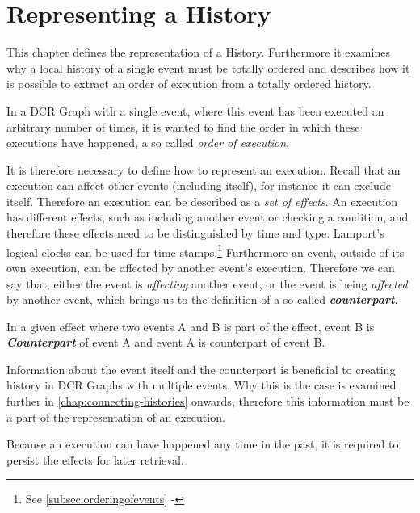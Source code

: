 \chapter{Representing a History}\label{chap:representing-a-history}
	This chapter defines the representation of a History. Furthermore it examines why a local history of a single event must be totally ordered and describes how it is possible to extract an order of execution from a totally ordered history.
	
	\newpar	In a DCR Graph with a single event, where this event has been executed an arbitrary number of times, it is wanted to find the order in which these executions have happened, a so called \textit{order of execution}.
	
	\newpar	It is therefore necessary to define how to represent an execution. Recall that an execution can affect other events (including itself), for instance it can exclude itself. Therefore an execution can be described as a \textit{set of effects}. An execution has different effects, such as including another event or checking a condition, and therefore these effects need to be distinguished by time and type. Lamport's logical clocks can be used for time stamps.\footnote{See \autoref{subsec:orderingofevents} - } Furthermore an event, outside of its own execution, can be affected by another event's execution. Therefore we can say that, either the event is \textit{affecting} another event, or the event is being \textit{affected} by another event, which brings us to the definition of a so called \textit{\textbf{counterpart}}.

	\noindent\hrulefill	
	\begin{definition}
		In a given effect where two events A and B is part of the effect, event B is \textbf{\textit{Counterpart}} of event A and event A is counterpart of event B.
		
		\noindent\hrulefill
	\end{definition}
	
	\newpar Information about the event itself and the counterpart is beneficial to creating history in DCR Graphs with multiple events. Why this is the case is examined further in \autoref{chap:connecting-histories} onwards, therefore this information must be a part of the representation of an execution.
	
	\newpar Because an execution can have happened any time in the past, it is required to persist the effects for later retrieval.
	

